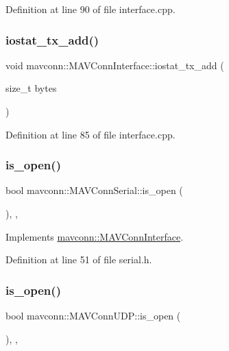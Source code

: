 Definition at line 90 of file interface.\+cpp.

\mbox{\label{group__mavconn_gaabfc001375565bdafd47172374fcda0f}} 
\subsubsection{\texorpdfstring{iostat\_tx\_add()}{iostat\_tx\_add()}}
{\footnotesize\ttfamily void mavconn\+::\+M\+A\+V\+Conn\+Interface\+::iostat\+\_\+tx\+\_\+add (\begin{DoxyParamCaption}\item[{size\+\_\+t}]{bytes }\end{DoxyParamCaption})\hspace{0.3cm}{\ttfamily [protected]}}



Definition at line 85 of file interface.\+cpp.

\mbox{\label{group__mavconn_ga7b2ae62cddd41671b3312050f64b3036}} 
\subsubsection{\texorpdfstring{is\_open()}{is\_open()}\hspace{0.1cm}{\footnotesize\ttfamily [1/5]}}
{\footnotesize\ttfamily bool mavconn\+::\+M\+A\+V\+Conn\+Serial\+::is\+\_\+open (\begin{DoxyParamCaption}{ }\end{DoxyParamCaption})\hspace{0.3cm}{\ttfamily [inline]}, {\ttfamily [override]}, {\ttfamily [virtual]}}



Implements \mbox{\hyperlink{group__mavconn_ga135638c7c953c50bee3143a9e2b35416}{mavconn\+::\+M\+A\+V\+Conn\+Interface}}.



Definition at line 51 of file serial.\+h.

\mbox{\label{group__mavconn_ga496ff8d6806b35c993740cc05727f59c}} 
\subsubsection{\texorpdfstring{is\_open()}{is\_open()}\hspace{0.1cm}{\footnotesize\ttfamily [2/5]}}
{\footnotesize\ttfamily bool mavconn\+::\+M\+A\+V\+Conn\+U\+D\+P\+::is\+\_\+open (\begin{DoxyParamCaption}{ }\end{DoxyParamCaption})\hspace{0.3cm}{\ttfamily [inline]}, {\ttfamily [override]}, {\ttfamily [virtual]}}



